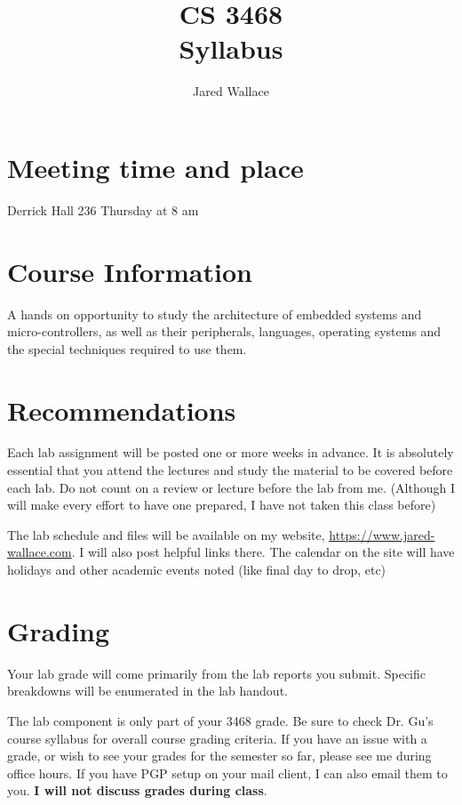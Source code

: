 \documentclass[letterpaper,12pt]{article}
\title{\Large CS 3468\\Syllabus}
\author{Jared Wallace}
\date{}
\begin{document}
\maketitle

\vspace{30mm}

\section*{Meeting time and place}
Derrick Hall 236
Thursday at 8 am

\section*{Course Information}

A hands on opportunity to study the architecture of embedded systems and
micro-controllers, as well as their peripherals, languages, operating systems
and the special techniques required to use them.
\section*{Recommendations}
Each lab assignment will be posted one or more weeks in advance. It is absolutely
essential that you attend the lectures and study the material to be covered before
each lab. Do not count on a review or lecture before the lab from me. (Although I
will make every effort to have one prepared, I have not taken this class before)

The lab schedule and files will be available on my website, \url{https://www.jared-wallace.com}.
I will also post helpful links there. The calendar on the site will have holidays and
other academic events noted (like final day to drop, etc)

\section*{Grading}
Your lab grade will come primarily from the lab reports you submit. Specific breakdowns
will be enumerated in the lab handout.

The lab component is only part of your 3468 grade. Be sure to
check Dr. Gu's course syllabus for overall course grading criteria. If
you have an issue with a grade, or wish to see your grades for the semester so far,
please see me during office hours. If you have PGP setup on your mail client,
I can also email them to you. \textbf{I will not discuss grades during class}.
\end{document}
